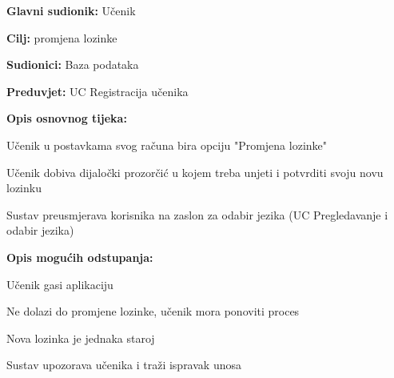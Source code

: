 \noindent {}
\begin{packed_item}

	\item \textbf{Glavni sudionik:} Učenik
	\item  \textbf{Cilj:} promjena lozinke
	\item  \textbf{Sudionici:} Baza podataka
	\item  \textbf{Preduvjet:} UC Registracija učenika
	\item  \textbf{Opis osnovnog tijeka:}
	
	\item[] \begin{packed_enum}

		\item Učenik u postavkama svog računa bira opciju "Promjena lozinke"
		\item Učenik dobiva dijaločki prozorčić u kojem treba unjeti i potvrditi svoju novu lozinku
		\item Sustav preusmjerava korisnika na zaslon za odabir jezika (UC Pregledavanje i odabir jezika)
	\end{packed_enum}
	
	\item  \textbf{Opis mogućih odstupanja:}
	
	\item[] \begin{packed_item}

		\item[1.a]Učenik gasi aplikaciju
		\item[] \begin{packed_enum}
			
			\item Ne dolazi do promjene lozinke, učenik mora ponoviti proces					
		\end{packed_enum}

		\item[2.a] Nova lozinka je jednaka staroj
		\item[] \begin{packed_enum}
			
			\item Sustav upozorava učenika i traži ispravak unosa  								
		\end{packed_enum}
		
	\end{packed_item}
\end{packed_item}

